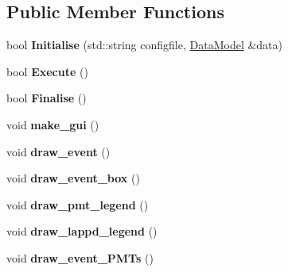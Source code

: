 \subsection*{Public Member Functions}
\begin{DoxyCompactItemize}
\item 
\hypertarget{classEventDisplay_afc7edf8f24c74b37c29355745b3cc4ad}{bool {\bfseries Initialise} (std\-::string configfile, \hyperlink{classDataModel}{Data\-Model} \&data)}\label{classEventDisplay_afc7edf8f24c74b37c29355745b3cc4ad}

\item 
\hypertarget{classEventDisplay_a3468ff690ccecd91c2b7ee84021d5e4b}{bool {\bfseries Execute} ()}\label{classEventDisplay_a3468ff690ccecd91c2b7ee84021d5e4b}

\item 
\hypertarget{classEventDisplay_a0fdfbdba7f66663ca61a2015c3f87a27}{bool {\bfseries Finalise} ()}\label{classEventDisplay_a0fdfbdba7f66663ca61a2015c3f87a27}

\item 
\hypertarget{classEventDisplay_a0badd7d4c163fd33246ef2fb5f3f5b11}{void {\bfseries make\-\_\-gui} ()}\label{classEventDisplay_a0badd7d4c163fd33246ef2fb5f3f5b11}

\item 
\hypertarget{classEventDisplay_acdb0b7db7007c50303e29321e8b178df}{void {\bfseries draw\-\_\-event} ()}\label{classEventDisplay_acdb0b7db7007c50303e29321e8b178df}

\item 
\hypertarget{classEventDisplay_a45064b5628a451ee019e2dc47fb80268}{void {\bfseries draw\-\_\-event\-\_\-box} ()}\label{classEventDisplay_a45064b5628a451ee019e2dc47fb80268}

\item 
\hypertarget{classEventDisplay_a7ffd0d9f6b41b5713655e11e8d79840c}{void {\bfseries draw\-\_\-pmt\-\_\-legend} ()}\label{classEventDisplay_a7ffd0d9f6b41b5713655e11e8d79840c}

\item 
\hypertarget{classEventDisplay_a1405448b0dafae76a5ff4bcbb1bc2fa4}{void {\bfseries draw\-\_\-lappd\-\_\-legend} ()}\label{classEventDisplay_a1405448b0dafae76a5ff4bcbb1bc2fa4}

\item 
\hypertarget{classEventDisplay_a69683e114fa3e1702ba154789672f492}{void {\bfseries draw\-\_\-event\-\_\-\-P\-M\-Ts} ()}\label{classEventDisplay_a69683e114fa3e1702ba154789672f492}


\end{DoxyCompactItemize}
